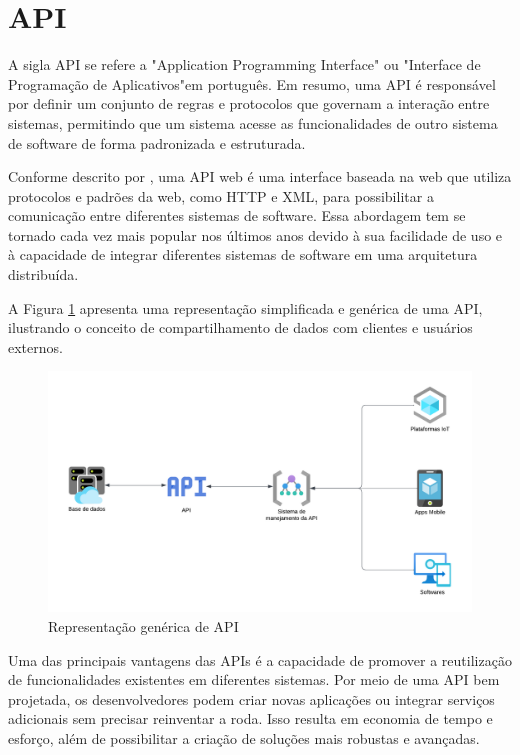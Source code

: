 \documentclass[tcc,capa]{texufpel}
\begin{document}
\section{API}
A sigla API se refere a "Application Programming Interface" \space ou "Interface de Programação de Aplicativos"\space em português. Em resumo, uma API é responsável por definir um conjunto de regras e protocolos que governam a interação entre sistemas, permitindo que um sistema acesse as funcionalidades de outro sistema de software de forma padronizada e estruturada.

Conforme descrito por \citet{FIELDING:2002}, uma API web é uma interface baseada na web que utiliza protocolos e padrões da web, como HTTP e XML, para possibilitar a comunicação entre diferentes sistemas de software. Essa abordagem tem se tornado cada vez mais popular nos últimos anos devido à sua facilidade de uso e à capacidade de integrar diferentes sistemas de software em uma arquitetura distribuída.

A Figura \ref{apigenerica} apresenta uma representação simplificada e genérica de uma API, ilustrando o conceito de compartilhamento de dados com clientes e usuários externos.
\begin{figure}[htbp]
\centering \includegraphics[scale=.57]{assets/apigenerica.png}
\caption{Representação genérica de API}
\label{apigenerica}
\end{figure}
Uma das principais vantagens das APIs é a capacidade de promover a reutilização de funcionalidades existentes em diferentes sistemas. Por meio de uma API bem projetada, os desenvolvedores podem criar novas aplicações ou integrar serviços adicionais sem precisar reinventar a roda. Isso resulta em economia de tempo e esforço, além de possibilitar a criação de soluções mais robustas e avançadas.
\end{document}
